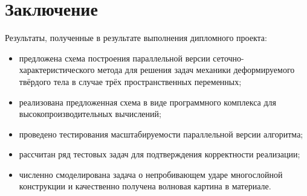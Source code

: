 \section{Заключение}
Результаты, полученные в результате выполнения дипломного проекта:
\begin{itemize}
\item предложена схема построения параллельной версии
сеточно-характеристического метода для решения задач механики деформируемого
твёрдого тела в случае трёх пространственных переменных;
\item реализована предложенная схема в виде программного комплекса для
высокопроизводительных вычислений;
\item проведено тестирования масштабируемости параллельной версии алгоритма;
\item рассчитан ряд тестовых задач для подтверждения корректности реализации;
\item численно смоделирована задача о непробивающем ударе многослойной
конструкции и качественно получена волновая картина в материале.
\end{itemize}
